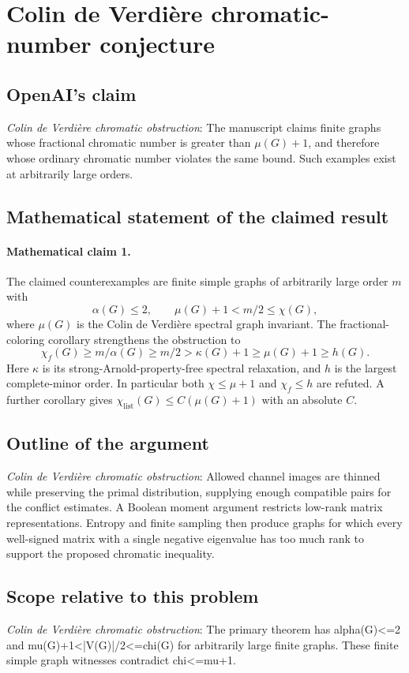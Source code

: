 \documentclass[11pt]{article}
\begin{document}
\section*{Colin de Verdière chromatic-number conjecture}

\subsection{OpenAI's claim}
\textit{Colin de Verdière chromatic obstruction}: The manuscript claims finite graphs whose fractional chromatic number is greater than $\mu(G)+1$, and therefore whose ordinary chromatic number violates the same bound. Such examples exist at arbitrarily large orders.

\subsection{Mathematical statement of the claimed result}
\paragraph{Mathematical claim 1.} The claimed counterexamples are finite simple graphs of arbitrarily large order $m$ with \[\alpha(G)\le2,\qquad\mu(G)+1<m/2\le\chi(G),\] where $\mu(G)$ is the Colin de Verdi\`ere spectral graph invariant. The fractional-coloring corollary strengthens the obstruction to \[\chi_f(G)\ge m/\alpha(G)\ge m/2>\kappa(G)+1\ge\mu(G)+1\ge h(G).\] Here $\kappa$ is its strong-Arnold-property-free spectral relaxation, and $h$ is the largest complete-minor order. In particular both $\chi\le\mu+1$ and $\chi_f\le h$ are refuted. A further corollary gives $\chi_{\mathrm{list}}(G)\le C(\mu(G)+1)$ with an absolute $C$.

\subsection{Outline of the argument}
\textit{Colin de Verdière chromatic obstruction}: Allowed channel images are thinned while preserving the primal distribution, supplying enough compatible pairs for the conflict estimates. A Boolean moment argument restricts low-rank matrix representations. Entropy and finite sampling then produce graphs for which every well-signed matrix with a single negative eigenvalue has too much rank to support the proposed chromatic inequality.

\subsection{Scope relative to this problem}
\textit{Colin de Verdière chromatic obstruction}: The primary theorem has alpha(G)<=2 and mu(G)+1<|V(G)|/2<=chi(G) for arbitrarily large finite graphs. These finite simple graph witnesses contradict chi<=mu+1.
\end{document}
